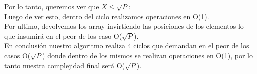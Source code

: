 Por lo tanto, queremos ver que $X \leq \sqrt{P}$:\\





Luego de ver esto, dentro del ciclo realizamos operaciones en O(1).\\
Por ultimo, devolvemos los array invirtiendo las posiciones de los elementos lo que insumir\'a en el peor de los caso O($\sqrt{P}$).\\

En conclusi\'on nuestro algoritmo realiza 4 ciclos que demandan en el peor de los casos O($\sqrt{P}$) donde dentro de los mismos se realizan operaciones en O(1), por lo tanto nuestra complejidad final ser\'a
O($\sqrt{P}$).




